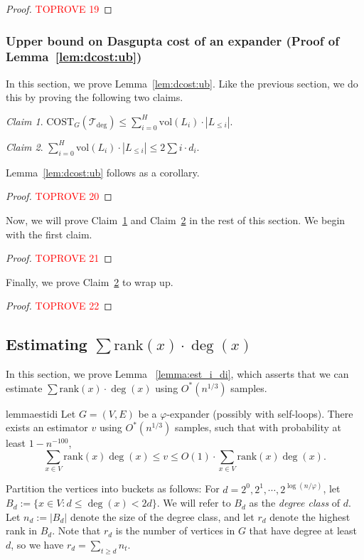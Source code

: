 \documentclass[letterpaper,11pt]{article}
\newcommand{\tdeg}{\mathcal{T}_{\deg}}
\newcommand{\CT}{\text{COST}}
\newcommand{\rank}{\mathrm{rank}}
\theoremstyle{plain}
\theoremstyle{definition}
\theoremstyle{remark}
\newtheorem{claim}{Claim}
\newcommand{\vol}{\text{vol}}
\begin{document}
\begin{proof}\textcolor{red}{TOPROVE 19}\end{proof}


\subsubsection{Upper bound on Dasgupta cost of an expander (Proof of Lemma~\ref{lem:dcost:ub})}

In this section, we prove Lemma~\ref{lem:dcost:ub}. Like the previous section,
we do this by proving the following two claims.

\begin{claim} \label{clm:ub:aux}
	$\CT_G(\tdeg) \leq \sum_{i = 0}^{H} \vol(L_i) \cdot |L_{\leq i}|$.
\end{claim}


\begin{claim} \label{clm:ub:final}
	$\sum_{i = 0}^{H} \vol(L_i) \cdot |L_{\leq i}| \leq 2 \sum i \cdot d_i$.
\end{claim}

Lemma~\ref{lem:dcost:ub} follows as a corollary.

\begin{proof}\textcolor{red}{TOPROVE 20}\end{proof}

Now, we will prove Claim~\ref{clm:ub:aux} and Claim~\ref{clm:ub:final} in the rest of this
section. We begin with the first claim.

\begin{proof}\textcolor{red}{TOPROVE 21}\end{proof}

Finally, we prove Claim~\ref{clm:ub:final} to wrap up. 

\begin{proof}\textcolor{red}{TOPROVE 22}\end{proof}

\subsection{Estimating $\sum \rank(x)\cdot \deg(x)$}\label{sec:rankdeg}
In this section, we prove Lemma ~\ref{lemma:est_i_di}, which asserts that we can estimate $\sum \rank(x)\cdot \deg(x)$ using $O^*\left(n^{1/3}\right)$ samples. 
\begin{restatable}{lemma}{estidi}
	\label{lemma:est_i_di}
Let $G = (V,E)$ be a $\varphi$-expander (possibly with self-loops).
 There exists an estimator $v$ using $O^*\left(n^{1/3}\right)$  samples, such that with probability at least $1-n^{-100}$, 
 \[ \sum_{x \in V} \rank(x) \deg(x) \leq v \leq O(1)\cdot \sum_{x \in V} \rank(x) \deg(x). \]
\end{restatable}
Partition the vertices into buckets as follows: For $d = 2^0, 2^1, \cdots, 2^{\log(n /\varphi)}$, let $B_d := \{x \in V : d \leq \deg(x) <2d\}.$  We will refer to $B_d$ as the \emph{degree class} of $d$. Let $n_d:=|B_d|$ denote the size of the degree class, and let $r_d$ denote the highest rank in $B_d$. Note that $r_d$ is the number of vertices in $G$ that have degree at least $d$, so we have $r_d= \sum_{t \geq d} n_t$. 
\end{document}
